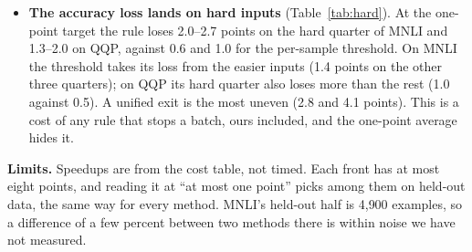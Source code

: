 \begin{itemize}
  the plan variant is ahead (1.91\x{} against 1.88\x{} for the threshold with a plan; 1.78\x{} without a plan), and
  the plan variant is not a cheaper search than the baselines. It does not buy transfer between deployments
  (Table~\ref{tab:corrections}). Whether it needs less calibration data is tested in Section~\ref{sec:tighten}.
  \item \textbf{The accuracy loss lands on hard inputs} (Table~\ref{tab:hard}). At the one-point target the rule
  loses 2.0--2.7 points on the hard quarter of MNLI and 1.3--2.0 on QQP, against 0.6 and 1.0 for the per-sample
  threshold. On MNLI the threshold takes its loss from the easier inputs (1.4 points on the other three quarters); on
  QQP its hard quarter also loses more than the rest (1.0 against 0.5). A unified exit is the most uneven (2.8 and
  4.1 points). This is a cost of any rule that stops a batch, ours included, and the one-point average hides it.
\end{itemize}
\textbf{Limits.} Speedups are from the cost table, not timed. Each front has at most eight points, and reading it at
``at most one point'' picks among them on held-out data, the same way for every method. MNLI's held-out half is
4{,}900 examples, so a difference of a few percent between two methods there is within noise we have not measured.

